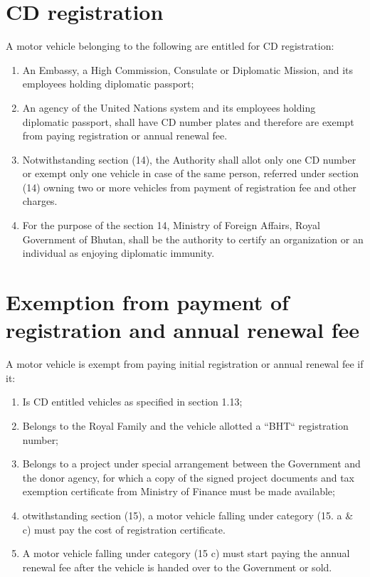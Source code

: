 \documentclass[
]{book}
\providecommand{\tightlist}{%
  \setlength{\itemsep}{0pt}\setlength{\parskip}{0pt}}
\begin{document}
\hypertarget{cd-registration}{%
\section{CD registration}\label{cd-registration}}

A motor vehicle belonging to the following are entitled for CD registration:

\begin{enumerate}
\def\labelenumi{\alph{enumi}.}
\tightlist
\item
  An Embassy, a High Commission, Consulate or Diplomatic Mission, and its employees holding diplomatic passport;
\item
  An agency of the United Nations system and its employees holding diplomatic passport, shall have CD number plates and therefore are exempt from paying registration or annual renewal fee.
\item
  Notwithstanding section (14), the Authority shall allot only one CD number or exempt only one vehicle in case of the same person, referred under section (14) owning two or more vehicles from payment of registration fee and other charges.
\item
  For the purpose of the section 14, Ministry of Foreign Affairs, Royal Government of Bhutan, shall be the authority to certify an organization or an individual as enjoying diplomatic immunity.
\end{enumerate}

\hypertarget{exemption-from-payment-of-registration-and-annual-renewal-fee}{%
\section{Exemption from payment of registration and annual renewal fee}\label{exemption-from-payment-of-registration-and-annual-renewal-fee}}

A motor vehicle is exempt from paying initial registration or annual renewal fee if it:

\begin{enumerate}
\def\labelenumi{\alph{enumi}.}
\tightlist
\item
  Is CD entitled vehicles as specified in section 1.13;
\item
  Belongs to the Royal Family and the vehicle allotted a ``BHT`` registration number;
\item
  Belongs to a project under special arrangement between the Government and the donor agency, for which a copy of the signed project documents and tax exemption certificate from Ministry of Finance must be made available;
\item
  otwithstanding section (15), a motor vehicle falling under category (15. a \& c) must pay the cost of registration certificate.
\item
  A motor vehicle falling under category (15 c) must start paying the annual renewal fee after the vehicle is handed over to the Government or sold.
\end{enumerate}
\end{document}
